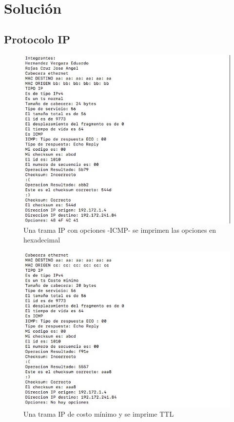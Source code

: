 \section{Soluci\'on}
	\setlength{\parindent}{1em}
	\setlength{\parskip}{10pt}
	\subsection{Protocolo IP}
		\begin{figure}[h]
			\centering		
			\includegraphics[width=\textwidth]{Ejercicio1}
			\caption{Una trama IP con opciones -ICMP- se imprimen las opciones en hexadecimal}
		\end{figure}
	\begin{figure}[h]
			\centering		
			\includegraphics[width=\textwidth]{Ejercicio2}
			\caption{Una trama IP de costo mínimo y se imprime TTL}
		\end{figure}
